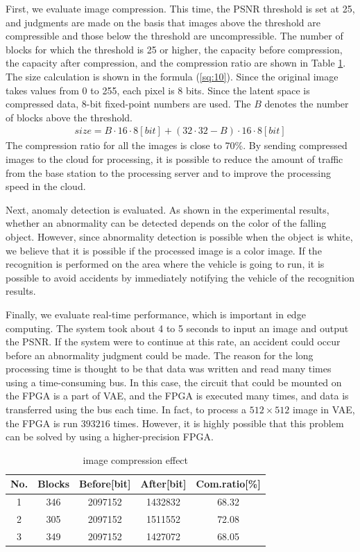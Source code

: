 \documentclass[conference]{IEEEtran}
\begin{document}
First, we evaluate image compression.
This time, the PSNR threshold is set at 25, and judgments are made on the basis that images above the threshold are compressible and those below the threshold are uncompressible.
The number of blocks for which the threshold is 25 or higher, the capacity before compression, the capacity after compression, and the compression ratio are shown in Table \ref{tb:4}.
The size calculation is shown in the formula (\ref{sq:10}).
Since the original image takes values from 0 to 255, each pixel is 8 bits.
Since the latent space is compressed data, 8-bit fixed-point numbers are used.
The $B$ denotes the number of blocks above the threshold.
\begin{align}
  size = B \cdot 16 \cdot 8[bit] + (32\cdot32 - B) \cdot 16 \cdot 8[bit] \label{sq:10}
\end{align}
The compression ratio for all the images is close to 70\%.
By sending compressed images to the cloud for processing, it is possible to reduce the amount of traffic from the base station to the processing server and to improve the processing speed in the cloud.

Next, anomaly detection is evaluated.
As shown in the experimental results, whether an abnormality can be detected depends on the color of the falling object.
However, since abnormality detection is possible when the object is white, we believe that it is possible if the processed image is a color image.
If the recognition is performed on the area where the vehicle is going to run, it is possible to avoid accidents by immediately notifying the vehicle of the recognition results.

Finally, we evaluate real-time performance, which is important in edge computing.
The system took about 4 to 5 seconds to input an image and output the PSNR.
If the system were to continue at this rate, an accident could occur before an abnormality judgment could be made.
The reason for the long processing time is thought to be that data was written and read many times using a time-consuming bus.
In this case, the circuit that could be mounted on the FPGA is a part of VAE, and the FPGA is executed many times, and data is transferred using the bus each time.
In fact, to process a $512\times512$ image in VAE, the FPGA is run $393216$ times.
However, it is highly possible that this problem can be solved by using a higher-precision FPGA.

\begin{table}[t]
  \centering
  \caption{image compression effect}
  \small
  \begin{tabular}{|c|c|c|c|c|} \hline
    No. & Blocks & Before[bit] & After[bit] & Com.ratio[\%]\\ \hline
    1 & 346 & 2097152 & 1432832 & 68.32 \\ \hline
    2 & 305 & 2097152 & 1511552 & 72.08 \\ \hline
    3 & 349 & 2097152 & 1427072 & 68.05 \\ \hline
  \end{tabular}
  \label{tb:4}
\end{table}
\end{document}
